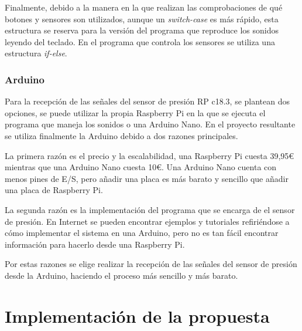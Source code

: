 \documentclass{article}
\begin{document}
            Finalmente, debido a la manera en la que realizan las comprobaciones de qué botones y sensores son
            utilizados, aunque un \textit{switch-case} es más rápido, esta estructura se reserva para la versión del
            programa que reproduce los sonidos leyendo del teclado. En el programa que controla los sensores se utiliza
            una estructura \textit{if-else}.



    \subsubsection{Arduino} %
    \label{ssub:Arduino}

        Para la recepción de las señales del sensor de presión RP c18.3, se plantean dos opciones, se puede utilizar
        la propia Raspberry Pi en la que se ejecuta el programa que maneja los sonidos o una Arduino Nano. En el
        proyecto resultante se utiliza finalmente la Arduino debido a dos razones principales.\newline

        La primera razón es el precio y la escalabilidad, una Raspberry Pi cuesta 39,95\euro{} mientras que una
        Arduino Nano cuesta 10\euro{}. Una Arduino Nano cuenta con menos pines de E/S, pero añadir una placa es más
        barato y sencillo que añadir una placa de Raspberry Pi.\newline

        La segunda razón es la implementación del programa que se encarga de el sensor de presión. En Internet se
        pueden encontrar ejemplos y tutoriales refiriéndose a cómo implementar el sistema en una Arduino, pero no
        es tan fácil encontrar información para hacerlo desde una Raspberry Pi.\newline

        Por estas razones se elige realizar la recepción de las señales del sensor de presión desde la Arduino,
        haciendo el proceso más sencillo y más barato.



\section{Implementación de la propuesta}
\label{sec:Implementacion}
\end{document}
